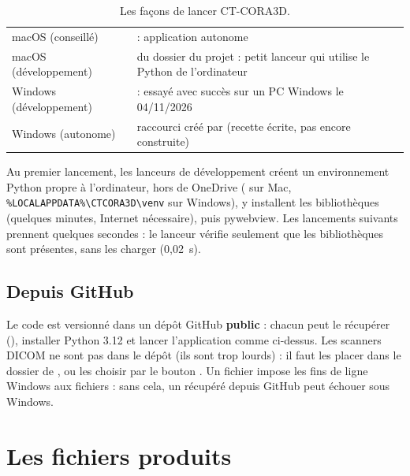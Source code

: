 \begin{table}[htbp]
\centering\small
\caption{Les façons de lancer CT-CORA3D.}
\label{tab:lancer}
\begin{tabularx}{\linewidth}{L{3.2cm}Y}
\toprule
{} &  \\
\midrule
macOS (conseillé) &  : application autonome \\
macOS (développement) &  du dossier du projet : petit lanceur qui utilise le Python de l'ordinateur \\
Windows (développement) &  : essayé avec succès sur un PC Windows le 04/11/2026 \\
Windows (autonome) & raccourci créé par  (recette écrite, pas encore construite) \\
\bottomrule
\end{tabularx}
\end{table}

Au premier lancement, les lanceurs de développement créent un environnement Python propre à l'ordinateur, hors de
OneDrive ( sur Mac, \texttt{\%LOCALAPPDATA\%\textbackslash{}CTCORA3D\textbackslash{}venv} sur
Windows), y installent les bibliothèques (quelques minutes, Internet nécessaire), puis pywebview. Les lancements
suivants prennent quelques secondes : le lanceur vérifie seulement que les bibliothèques sont présentes, sans les
charger (0,02~s).

\subsection{Depuis GitHub}

Le code est versionné dans un dépôt GitHub \textbf{public} : chacun peut le récupérer
(), installer Python 3.12 et lancer l'application comme ci-dessus. Les scanners DICOM ne sont pas dans le
dépôt (ils sont trop lourds) : il faut les placer dans le dossier  de , ou les choisir par le bouton . Un fichier  impose les fins de ligne Windows aux fichiers
 : sans cela, un  récupéré depuis GitHub peut échouer sous Windows.

\section{Les fichiers produits}

